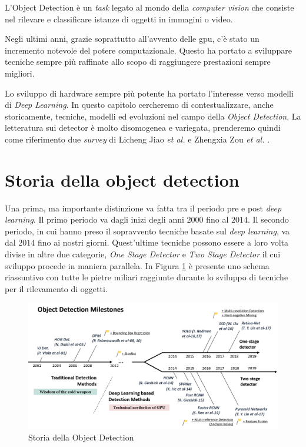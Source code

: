 L'Object Detection è un \textit{task} legato al mondo della \textit{computer vision}
che consiste nel rilevare e classificare istanze di oggetti in immagini o video.

Negli ultimi anni, grazie soprattutto all'avvento delle \ac{gpu}, c'è stato un 
incremento notevole del potere computazionale. Questo ha portato a sviluppare tecniche 
sempre più raffinate allo scopo di raggiungere prestazioni sempre migliori. 

Lo sviluppo di hardware sempre più potente ha portato l'interesse verso modelli di  \textit{Deep Learning}. 
In questo capitolo cercheremo di contestualizzare, anche storicamente, tecniche, modelli ed evoluzioni
nel campo della \textit{Object Detection}. 
La letteratura sui detector è molto disomogenea e variegata, prenderemo quindi come 
riferimento due \textit{survey} di Licheng Jiao \textit{et al.} 
\cite{DBLP:journals/corr/abs-1907-09408} e 
Zhengxia Zou \textit{et al.} \cite{DBLP:journals/corr/abs-1905-05055}.


\section{Storia della object detection}
\label{sec:history_obj}
Una prima, ma importante distinzione va fatta tra il periodo pre e post \textit{deep learning}. Il primo periodo va dagli inizi degli anni $2000$ fino al $2014$. Il secondo periodo, in cui hanno preso il sopravvento tecniche basate sul \textit{deep learning}, va dal $2014$ fino ai nostri giorni. Quest'ultime tecniche possono essere a loro volta divise in altre due categorie, \textit{One Stage Detector} e \textit{Two Stage Detector} il cui sviluppo procede in maniera parallela. In Figura \ref{fig:history_object_detection} è presente uno schema riassuntivo con tutte le pietre miliari raggiunte durante lo sviluppo di tecniche per il rilevamento di oggetti.
\begin{figure}
    \centering
    \includegraphics[width=\textwidth]{images/mile-stones.png}
    \caption{Storia della Object Detection \cite{DBLP:journals/corr/abs-1905-05055}}
    \label{fig:history_object_detection}
\end{figure}
